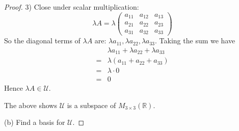 \documentclass{article}
\begin{document}
\begin{proof}
3) Close under scalar multiplication:
$$ \lambda A = \lambda  \begin{pmatrix} a_{11}&a_{12}&a_{13} \\a_{21}&a_{22}&a_{23}\\a_{31}&a_{32}&a_{33}\end{pmatrix}$$
So the diagonal terms of $\lambda A$ are: $\lambda a_{11}, \lambda a_{22}, \lambda a_{33}$. 
Taking the sum we have 
\begin{align*}
& \lambda a_{11}+ \lambda a_{22}+ \lambda a_{33} \\
=& \lambda (a_{11}+a_{22}+a_{33}) \\
=& \lambda \cdot 0 \\
=& 0
\end{align*}
Hence $\lambda A \in \mathcal{U}$.

The above shows $\mathcal{U}$ is a subspace of $M_{3 \times 3}(\mathbb{R})$.

\bigskip

(b) Find a basis for $\mathcal{U}$.


\end{proof}
\end{document}
